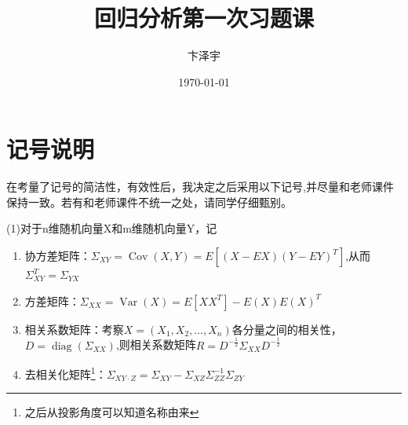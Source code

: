 \documentclass[cn,hazy,green,12pt,normal]{elegantnote}
\title{回归分析第一次习题课}
\author{卞泽宇}
\institute{USTC}
\date{\today}
\DeclareMathOperator{\Cov}{Cov}
\DeclareMathOperator{\Var}{Var}
\DeclareMathOperator{\diag}{diag}
\numberwithin{equation}{section}
\numberwithin{subsection}{section}
\begin{document}
\maketitle

\tableofcontents

\section{记号说明}
在考量了记号的简洁性，有效性后，我决定之后采用以下记号,并尽量和老师课件保持一致。若有和老师课件不统一之处，请同学仔细甄别。

(1)对于n维随机向量X和m维随机向量Y，记
\begin{enumerate}
    \item 协方差矩阵：$\Sigma_{XY}=\Cov(X,Y)=E[(X-EX)(Y-EY)^T]$,从而$\Sigma_{XY}^T=\Sigma_{YX}$
    \item 方差矩阵：$\Sigma_{XX}=\Var(X)=E[XX^T]-E(X)E(X)^T$
    \item 相关系数矩阵：考察$X=(X_1,X_2,\dots,X_n)$各分量之间的相关性，$D=\diag(\Sigma_{XX})$,则相关系数矩阵$R=D^{-\frac{1}{2}}\Sigma_{XX}D^{-\frac{1}{2}}$
    \item 去相关化矩阵\footnote{之后从投影角度可以知道名称由来}：$\Sigma_{XY \cdot Z}=\Sigma_{XY}-\Sigma_{XZ}\Sigma_{ZZ}^{-1}\Sigma_{ZY}$
\end{enumerate}
\end{document}
